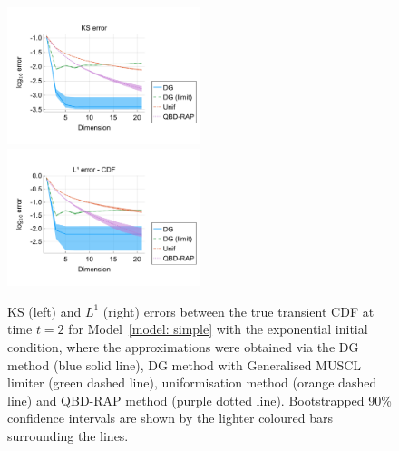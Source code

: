 \begin{figure}[h]
	\centering
	\includegraphics[width=0.5\textwidth,trim={0.75cm 0.8cm 0.25cm 1.25cm},clip]{chapter6/figs/hitting_times_model/reflecting_model/transient_distribution/exp/ks_error_formatted.pdf}%
	\includegraphics[width=0.5\textwidth,trim={0.75cm 0.8cm 0.25cm 1.25cm},clip]{chapter6/figs/hitting_times_model/reflecting_model/transient_distribution/exp/l1_cdf_error_formatted.pdf}
	\caption{KS (left) and \(L^1\) (right) errors between the true transient CDF at time \(t=2\) for Model~\ref{model: simple} with the exponential initial condition, where the approximations were obtained via the DG method (blue solid line), DG method with Generalised MUSCL limiter (green dashed line), uniformisation method (orange dashed line) and QBD-RAP method (purple dotted line). Bootstrapped 90\% confidence intervals are shown by the lighter coloured bars surrounding the lines.} 
	\label{fig: reflecting transient exp} 
\end{figure}

